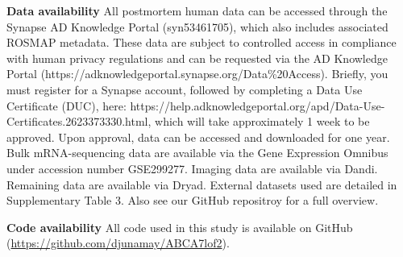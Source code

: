\textbf{Data availability}\newline\newline
All postmortem human data can be accessed through the Synapse AD Knowledge Portal (syn53461705), which also includes associated ROSMAP metadata. These data are subject to controlled access in compliance with human privacy regulations and can be requested via the AD Knowledge Portal (https://adknowledgeportal.synapse.org/Data\%20Access). Briefly, you must register for a Synapse account, followed by completing a Data Use Certificate (DUC), here: https://help.adknowledgeportal.org/apd/Data-Use-Certificates.2623373330.html, which will take approximately 1 week to be approved. Upon approval, data can be accessed and downloaded for one year. Bulk mRNA-sequencing data are available via the Gene Expression Omnibus under accession number GSE299277. Imaging data are available via Dandi. Remaining data are available via Dryad. External datasets used are detailed in Supplementary Table 3. Also see our GitHub repositroy for a full overview.

\textbf{Code availability}\newline\newline
All code used in this study is available on GitHub (\url{https://github.com/djunamay/ABCA7lof2}).
